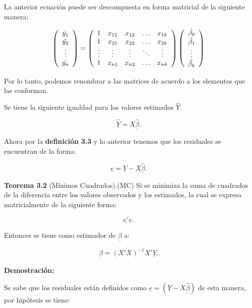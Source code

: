 \documentclass[
  a4paper,
  oneside,
  openany]{book}
\begin{document}
La anterior ecuación puede ser descompuesta en forma matricial de la siguiente manera:

\[
\left(
\begin{array}{c}
\hat{y_{1}} \\
\hat{y_{2}} \\
\vdots \\
\hat{y_{n}}\\
\end{array}
\right)=
\left(
\begin{array}{c c c c c}
1      & x_{11} & x_{12} & \ldots & x_{1k}\\ 
1      & x_{21} & x_{22} & \ldots & x_{2k}\\
\vdots & \vdots & \vdots & \ddots & \vdots\\
1      & x_{n1} & x_{n2} & \ldots & x_{nk}\\
\end{array}
\right)
\left(
\begin{array}{c}
\hat{\beta_{0}} \\
\hat{\beta_{1}} \\
\vdots \\
\hat{\beta_{k}}\\
\end{array}
\right)
\]

Por lo tanto, podemos renombrar a las matrices de acuerdo a los elementos que las conforman.

Se tiene la siguiente igualdad para los valores estimados \(\underline{\hat{Y}}.\)

\[\underline{\hat{Y}}=X \underline{\hat{\beta}}.\]

Ahora por la \textbf{definición 3.3} y lo anterior tenemos que los residuales se encuentran de la forma:

\[\underline{e}=\underline{Y}-X \underline{\hat{\beta}}.\]

\textbf{Teorema 3.2} (Mínimos Cuadrados).(MC) Si se minimiza la suma de cuadrados de la diferencia entre los valores observados y los estimados, la cual se expresa matricialmente de la siguiente forma:

\[\underline{e'}\underline{e}.\]

Entonces se tiene como estimador de \(\underline{\beta}\) a:

\[\underline{\hat{\beta}}=\left( X'X\right)^{-1}X'\underline{Y}.\]

\textbf{Demostración:}

Se sabe que los residuales están definidos como \(\underline{e}=\left( \underline{Y}-X \underline{\hat{\beta}}\right)\) de esta manera, por hipótesis se tiene:
\end{document}
